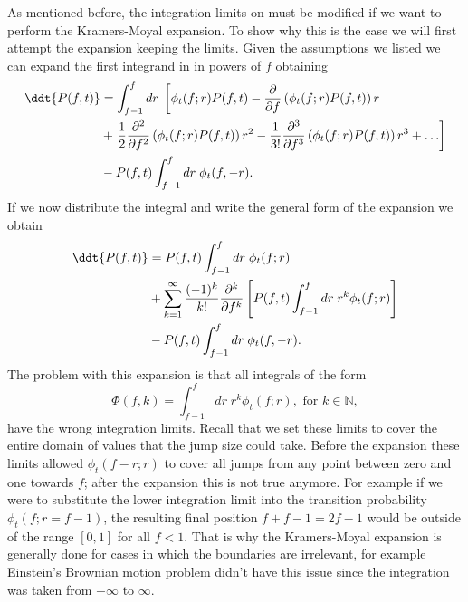 As mentioned before, the integration limits on  must be
modified if we want to perform the Kramers-Moyal expansion. To show why this is
the case we will first attempt the expansion keeping the limits. Given the
assumptions we listed we can expand the first integrand in  in powers of $f$ obtaining
\begin{align}
  \ddt{P(f, t)} &= \int^f_{f - 1} dr \;
  \left[
  \phi_t(f; r) P(f, t) -
  {\partial \over \partial f} \left( \phi_t(f; r) P(f, t) \right)  r \right. \\
  &+ \left.
  {1 \over 2} {\partial^2 \over \partial f^2}
  \left( \phi_t(f; r) P(f, t) \right) r^2 -
  {1 \over 3!} {\partial^3 \over \partial f^3}
  \left( \phi_t(f; r) P(f, t) \right) r^3 + \ldots
  \right] \\
  &-
  P(f, t) \int_{f - 1}^f dr \; \phi_t(f, -r).
\end{align}
If we now distribute the integral and write the general form of the expansion
we obtain
\begin{align}
  \ddt{P(f, t)} &= P(f, t)\int^f_{f - 1} dr \; \phi_t(f; r) \\
  &+
  \sum_{k=1}^\infty {(-1)^k \over k!} {\partial^k \over \partial f^k}
  \left[
  P(f, t) \int_{f-1}^f dr \; r^k \phi_t(f; r)
  \right] \\
  &-
  P(f, t) \int_{f - 1}^f dr \; \phi_t(f, -r).
\end{align}
The problem with this expansion is that all integrals of the form
\begin{equation}
  \Phi(f, k) = \int_{f-1}^f dr \; r^k \phi_t(f; r),
  \text{ for } k \in \mathbb{N},
\end{equation}
have the wrong integration limits. Recall that we set these limits to cover the
entire domain of values that the jump size could take. Before the expansion
these limits allowed $\phi_t(f - r; r)$ to cover all jumps from any point
between zero and one towards $f$; after the expansion this is not true anymore.
For example if we were to substitute the lower integration limit into the
transition probability $\phi_t(f; r = f-1)$, the resulting final position $f + f
-1 = 2f -1$ would be outside of the range $[0, 1]$ for all $f < 1$. That is why
the Kramers-Moyal expansion is generally done for cases in which the boundaries
are irrelevant, for example Einstein's Brownian motion problem didn't have this
issue since the integration was taken from $-\infty$ to $\infty$.

